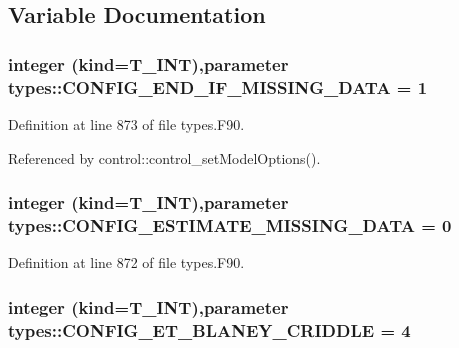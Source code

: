 \subsection{Variable Documentation}
\hypertarget{namespacetypes_a9c39021370e43388bffb3def7c09570b}{
\subsubsection[{CONFIG\_\-END\_\-IF\_\-MISSING\_\-DATA}]{\setlength{\rightskip}{0pt plus 5cm}integer (kind={\bf T\_\-INT}),parameter {\bf types::CONFIG\_\-END\_\-IF\_\-MISSING\_\-DATA} = 1}}
\label{namespacetypes_a9c39021370e43388bffb3def7c09570b}


Definition at line 873 of file types.F90.



Referenced by control::control\_\-setModelOptions().

\hypertarget{namespacetypes_a160cf0789c7288f51ba40cb7e19f46a3}{
\subsubsection[{CONFIG\_\-ESTIMATE\_\-MISSING\_\-DATA}]{\setlength{\rightskip}{0pt plus 5cm}integer (kind={\bf T\_\-INT}),parameter {\bf types::CONFIG\_\-ESTIMATE\_\-MISSING\_\-DATA} = 0}}
\label{namespacetypes_a160cf0789c7288f51ba40cb7e19f46a3}


Definition at line 872 of file types.F90.

\hypertarget{namespacetypes_af0221b3cca59af99efb7f293b9c19cd7}{
\subsubsection[{CONFIG\_\-ET\_\-BLANEY\_\-CRIDDLE}]{\setlength{\rightskip}{0pt plus 5cm}integer (kind={\bf T\_\-INT}),parameter {\bf types::CONFIG\_\-ET\_\-BLANEY\_\-CRIDDLE} = 4}}
\label{namespacetypes_af0221b3cca59af99efb7f293b9c19cd7}



